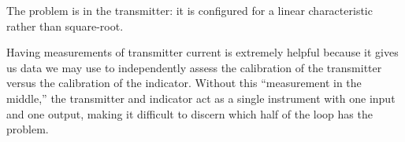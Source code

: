 











The problem is in the transmitter: it is configured for a linear characteristic rather than square-root.

\vskip 10pt

Having measurements of transmitter current is extremely helpful because it gives us data we may use to independently assess the calibration of the transmitter versus the calibration of the indicator.  Without this ``measurement in the middle,'' the transmitter and indicator act as a single instrument with one input and one output, making it difficult to discern which half of the loop has the problem.




